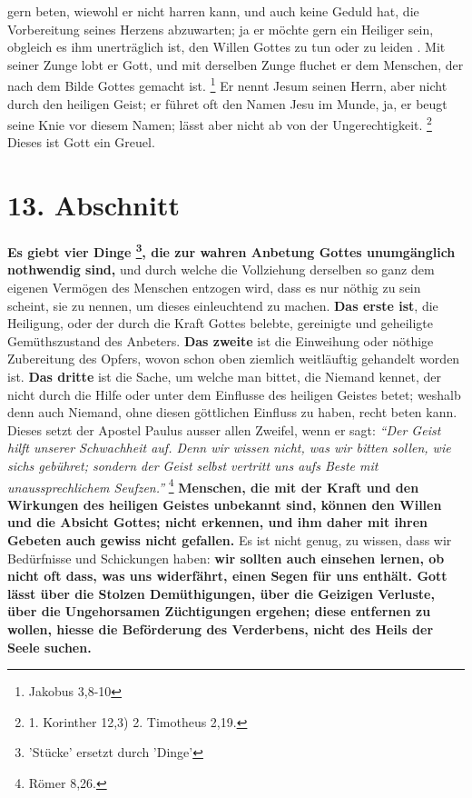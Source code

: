 gern beten, wiewohl er nicht harren kann, und auch keine Geduld 
hat, die
Vorbereitung seines Herzens abzuwarten; ja er möchte gern ein Heiliger
 sein,
obgleich es ihm unerträglich ist, den Willen Gottes zu tun  oder zu leiden . Mit
seiner Zunge lobt er Gott, und mit derselben Zunge fluchet er dem Menschen, der
nach dem Bilde Gottes gemacht ist.
\footnote{Jakobus 3,8-10}
 Er nennt Jesum
seinen Herrn, aber nicht durch den heiligen Geist; er führet oft den Namen
Jesu im Munde, ja, er beugt seine Knie vor diesem Namen; lässt aber nicht ab
von der Ungerechtigkeit. 
\footnote{1. Korinther 12,3) 2. Timotheus 2,19.}
Dieses ist Gott ein 
Greuel.

\section{13. Abschnitt} \label{kap6_ab13}

 \textbf{Es giebt vier Dinge
\footnote{'Stücke' ersetzt durch 'Dinge'}, die zur wahren Anbetung Gottes
unumgänglich
nothwendig
sind,} und durch welche die Vollziehung derselben so ganz dem eigenen Vermögen
des Menschen entzogen wird, dass es nur nöthig zu sein scheint, sie zu nennen,
um dieses einleuchtend zu machen. \textbf{Das erste ist}, die Heiligung, oder
der durch
die Kraft Gottes belebte, gereinigte und geheiligte Gemüthszustand des Anbeters.
\textbf{Das zweite} ist die Einweihung oder nöthige Zubereitung des Opfers,
wovon schon
oben ziemlich weitläuftig gehandelt worden ist. \textbf{Das dritte} ist die
Sache, um
welche man bittet, die Niemand kennet, der nicht durch die Hilfe oder unter dem
Einflusse des heiligen Geistes  betet; weshalb denn auch
Niemand, ohne diesen
göttlichen Einfluss zu haben, recht beten kann. Dieses setzt der Apostel
Paulus ausser allen Zweifel, wenn er sagt:
\textit{"`Der Geist hilft unserer
Schwachheit auf. Denn wir wissen nicht, was wir bitten sollen, wie sichs
gebühret; sondern der Geist selbst vertritt uns  aufs Beste mit
unaussprechlichem Seufzen."'}
\footnote{Römer 8,26.}
\textbf{Menschen, die mit der
Kraft
und den Wirkungen des heiligen Geistes unbekannt sind, können den Willen und die
Absicht Gottes; nicht erkennen, und ihm daher mit ihren Gebeten auch gewiss
nicht gefallen.} Es ist nicht genug, zu wissen, dass wir Bedürfnisse und
Schickungen haben:  \textbf{wir sollten auch einsehen
lernen, ob nicht oft dass,
was uns
widerfährt, einen Segen  für uns enthält. Gott lässt über die
Stolzen
Demüthigungen, über die Geizigen Verluste, über die
Ungehorsamen Züchtigungen
ergehen; diese entfernen zu wollen, hiesse die Beförderung des Verderbens, nicht
des Heils der Seele suchen.}

